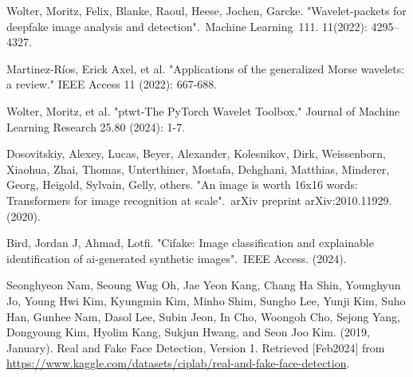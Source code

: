 \documentclass{svproc}
\begin{document}
\begin{thebibliography}{6}
  Wolter, Moritz, Felix, Blanke, Raoul, Heese, Jochen, Garcke. "Wavelet-packets for deepfake image analysis and detection". Machine Learning 111. 11(2022): 4295–4327.

  Martinez-Ríos, Erick Axel, et al. "Applications of the generalized Morse wavelets: a review." IEEE Access 11 (2022): 667-688.

  Wolter, Moritz, et al. "ptwt-The PyTorch Wavelet Toolbox." Journal of Machine Learning Research 25.80 (2024): 1-7.

  Dosovitskiy, Alexey, Lucas, Beyer, Alexander, Kolesnikov, Dirk, Weissenborn, Xiaohua, Zhai, Thomas, Unterthiner, Mostafa, Dehghani, Matthias, Minderer, Georg, Heigold, Sylvain, Gelly, others. "An image is worth 16x16 words: Transformers for image recognition at scale". arXiv preprint arXiv:2010.11929. (2020).

  Bird, Jordan J, Ahmad, Lotfi. "Cifake: Image classification and explainable identification of ai-generated synthetic images". IEEE Access. (2024).

  Seonghyeon Nam, Seoung Wug Oh, Jae Yeon Kang, Chang Ha Shin, Younghyun Jo, Young Hwi Kim, Kyungmin Kim, Minho Shim, Sungho Lee, Yunji Kim, Suho Han, Gunhee Nam, Dasol Lee, Subin Jeon, In Cho, Woongoh Cho, Sejong Yang, Dongyoung Kim, Hyolim Kang, Sukjun Hwang, and Seon Joo Kim. (2019, January). Real and Fake Face Detection, Version 1. Retrieved [Feb2024] from \url{https://www.kaggle.com/datasets/ciplab/real-and-fake-face-detection}.


\end{thebibliography}
\end{document}
